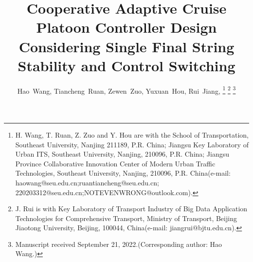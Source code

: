 \documentclass[journal]{IEEEtran}
\begin{document}
%
\title{Cooperative Adaptive Cruise Platoon Controller Design Considering Single Final String Stability and Control Switching}
%
%
%

\author{Hao~Wang,
  Tiancheng~Ruan,
  Zewen~Zuo,
  Yuxuan~Hou,
  Rui~Jiang,
  \thanks{H. Wang, T. Ruan, Z. Zuo and Y. Hou are with the
    School of Transportation, Southeast University, Nanjing 211189, P.R. China;
    Jiangsu Key Laboratory of Urban ITS, Southeast University, Nanjing, 210096, P.R. China;
    Jiangsu Province Collaborative Innovation Center of Modern Urban Traffic Technologies, Southeast University, Nanjing, 210096, P.R. China(e-mail: haowang@seu.edu.cn;ruantiancheng@seu.edu.cn; 220203312@seu.edu.cn;NOTEVENWRONG@outlook.com).}%
  \thanks{J. Rui is with Key Laboratory of Transport Industry of Big Data Application Technologies for Comprehensive Transport, Ministry of Transport, Beijing Jiaotong University, Beijing, 100044,  China(e-mail: jiangrui@bjtu.edu.cn).}%
  \thanks{Manuscript received September 21, 2022.(Corresponding author: Hao Wang.)}}

% 
%
\end{document}
